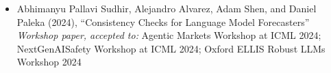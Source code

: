 \documentclass{article}
\begin{document}
\begin{itemize}

    \item
          Abhimanyu Pallavi Sudhir, Alejandro Alvarez, Adam Shen, and Daniel Paleka (2024), ``Consistency Checks for Language Model Forecasters'' \emph{Workshop paper, accepted to:} Agentic Markets Workshop at ICML 2024; NextGenAISafety Workshop at ICML 2024; Oxford ELLIS Robust LLMs Workshop 2024
\end{itemize}
\end{document}
